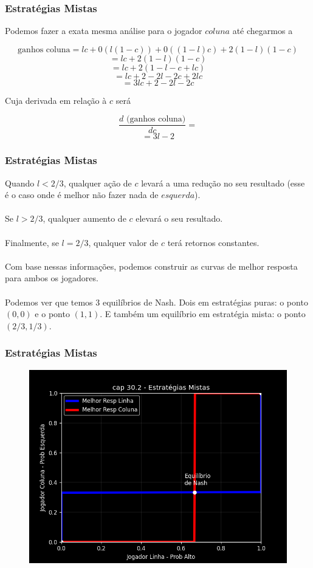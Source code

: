 \documentclass{beamer}[10]
\begin{document}
\begin{frame}
	\frametitle{Estratégias Mistas}

	Podemos fazer a exata mesma análise para o jogador $coluna$ até chegarmos a

	$$ \textrm{ganhos coluna} = lc + 0(l(1-c)) + 0((1-l)c) + 2(1-l)(1-c) $$
	$$  = lc + 2(1-l)(1-c) $$
	$$  = lc + 2(1-l-c+lc) $$
	$$  = lc + 2 - 2l - 2c + 2lc $$
	$$  = 3lc + 2 - 2l - 2c $$

	Cuja derivada em relação à $c$ será

	$$ \frac{d \textrm{ (ganhos coluna)}}{d c} =  $$
	$$ = 3l - 2 $$

\end{frame}

\begin{frame}
	\frametitle{Estratégias Mistas}

	Quando $l < 2/3$, qualquer ação de $c$ levará a uma redução no seu resultado (esse é o caso onde é melhor não fazer nada de $esquerda$).
	\\~\\
	Se $l > 2/3$, qualquer aumento de $c$ elevará o seu resultado. 
	\\~\\
	Finalmente, se $l = 2/3$, qualquer valor de $c$ terá retornos constantes.
	\\~\\
	Com base nessas informações, podemos construir as curvas de melhor resposta para ambos os jogadores.
	\\~\\
	Podemos ver que temos 3 equilíbrios de Nash. Dois em estratégias puras: o ponto $(0,0)$ e o ponto $(1,1)$. E também um equilíbrio em estratégia mista: o ponto $(2/3,1/3)$.

\end{frame}

\begin{frame}
	\frametitle{Estratégias Mistas}

	\begin{figure}[H]
		\centering
		\includegraphics[scale=0.55]{cap30_2-estrategias_mistas.png}
	\end{figure}
	
\end{frame}
\end{document}
